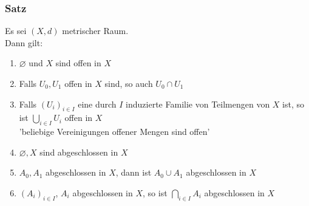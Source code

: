 \subsubsection{Satz} %
\label{ssub:satz}
Es sei $(X,d)$ metrischer Raum. \\
Dann gilt:
\begin{enumerate}
	\item $\varnothing$ und $X$ sind offen in $X$
	\item Falls $U_0,U_1$ offen in $X$ sind, so auch $U_0 \cap U_1$
	\item Falls $(U_i)_{i \in I}$ eine durch $I$ induzierte Familie von Teilmengen von $X$ ist, so ist $\bigcup\limits_{i \in I}U_i$ offen in $X$ \\
		'beliebige Vereinigungen offener Mengen sind offen'
	\item $\varnothing,X$ sind abgeschlossen in $X$
	\item $A_0,A_1$ abgeschlossen in $X$, dann ist $A_0 \cup A_1$ abgeschlossen in $X$
	\item $(A_i)_{i \in I}$, $A_i$ abgeschlossen in $X$, so ist $\bigcap\limits_{i \in I}A_i$ abgeschlossen in $X$
\end{enumerate}
